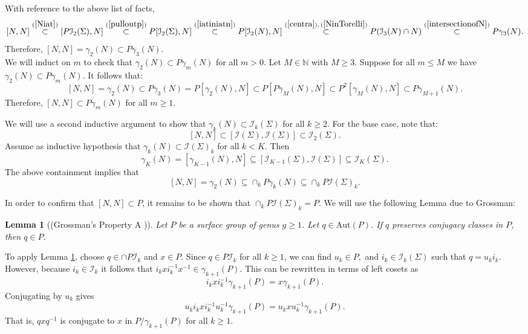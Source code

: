 \documentclass[a4paper]{amsproc}
\theoremstyle{TheoremNum}
\theoremstyle{Theorembold}
\newtheorem{lem}[thm]{Lemma}
\theoremstyle{TheoremboldDef}
\theoremstyle{TheoremboldRem}
\theoremstyle{TheoremboldRem}
\begin{document}
With reference to the above list of facts,
\[[N,N]\stackrel{(\ref{Niat})}{\subset} [P{{\mathcal{I}}_2(\Sigma)},N]\stackrel{(\ref{pulloutp})}{\subset} P[{{\mathcal{I}}_2(\Sigma)},N]\stackrel{(\ref{iatiniatn})}{\subset} P[{{\mathcal{I}}_2(N)},N]\stackrel{(\ref{centra}),\,(\ref{NinTorelli})}{\subset} P({\mathcal{I}}_3(N)\cap N)\stackrel{(\ref{intersectionofN})}{\subset} P\gamma_3(N).\] 
Therefore, $[N,N]=\gamma_2(N)\subset P\gamma_3(N)$.\\

We will induct on $m$ to check that $\gamma_2(N)\subset P\gamma_m(N)$ for all $m>0$. Let $M\in{\mathbb{N}}$ with $M{\geqslant} 3$. Suppose for all $m{\leqslant} M$ we have $\gamma_2(N)\subset P\gamma_m(N)$. 
It follows that: \[[N,N]=\gamma_2(N)\subset P\gamma_3(N)=P[\gamma_2(N),N]\subset P[P\gamma_{M}(N),N]\subset P^2[\gamma_M(N),N]\subset P\gamma_{M+1}(N).\] Therefore, $[N,N]\subset P\gamma_m(N)$ for all $m{\geqslant} 1$.

We will use a second inductive argument to show that $\gamma_k(N)\subset {{\mathcal{I}}_k(\Sigma)}$ for all $k{\geqslant} 2$. For the base case, note that: \[ [N,N]\subset[{{\mathcal{I}}(\Sigma)},{{\mathcal{I}}(\Sigma)}]\subset {{\mathcal{I}}_2(\Sigma)}.\] Assume as inductive hypothesis that $\gamma_k(N)\subset{{\mathcal{I}}(\Sigma)}_k$ for all $k< K$. Then \[\gamma_K(N)=[\gamma_{K-1}(N),N]\subseteq[{\mathcal{I}}_{K-1}(\Sigma),{{\mathcal{I}}(\Sigma)}]\subseteq {\mathcal{I}}_K(\Sigma).\]
 The above containment implies that \[[N,N]=\gamma_2(N)\subseteq \cap_k P\gamma_k(N)\subseteq \cap_k P{{\mathcal{I}}(\Sigma)}_k.\]

In order to confirm that $[N,N]\subset P$, it remains to be shown that  $\cap_k P{{\mathcal{I}}(\Sigma)}_k=P$. We will use the following Lemma due to Grossman:
  \begin{lem}[(Grossman's Property A \cite{grossman})]\label{gross}
    Let $P$ be a surface group of genus $g{\geqslant} 1$. Let $q\in \text{Aut}(P)$. If $q$ preserves conjugacy classes in $P$, then $q\in P$. 
   \end{lem}
   
   To apply Lemma \ref{gross}, choose $q\in \cap P{\mathcal{I}}_k$ and $x\in P$. Since $q\in P{\mathcal{I}}_k$ for all $k{\geqslant} 1$, we can find $u_k\in P,$ and $i_k\in {{\mathcal{I}}_k(\Sigma)}$ such that $q=u_ki_k$. However, because $i_k\in{\mathcal{I}}_k$ it follows that $i_kxi_k^{-1}x^{-1}\in\gamma_{k+1}(P)$. This can be rewritten in terms of left cosets as \[i_kxi_k^{-1}\gamma_{k+1}(P)=x\gamma_{k+1}(P).\] 
    Conjugating by $u_k$ gives \[u_ki_kxi_k^{-1}u_k^{-1}\gamma_{k+1}(P)=u_kxu_k^{-1}\gamma_{k+1}(P).\] That is, $q xq^{-1}$ is conjugate to $x$ in $P/\gamma_{k+1}(P)$ for all $k{\geqslant} 1$.\\
    
\end{document}
